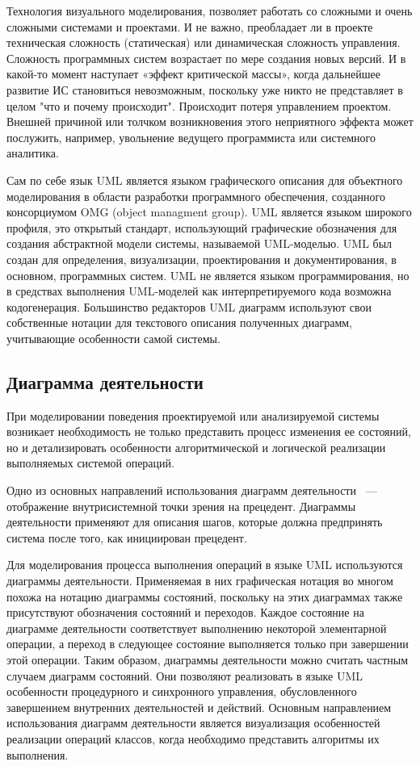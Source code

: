 Технология визуального моделирования, позволяет работать со сложными и очень сложными системами и проектами. И не важно, преобладает ли в проекте техническая сложность (статическая) или динамическая сложность управления. Сложность программных систем возрастает по мере создания новых версий. И в какой-то момент наступает «эффект критической массы», когда дальнейшее развитие ИС становиться невозможным, поскольку уже никто не представляет в целом "что и почему происходит". Происходит потеря управлением проектом. Внешней причиной или толчком возникновения этого неприятного эффекта может послужить, например, увольнение ведущего программиста или системного аналитика.

Сам по себе язык UML является языком графического описания для объектного моделирования в области разработки программного обеспечения, созданного консорциумом OMG (object managment group). UML является языком широкого профиля, это открытый стандарт, использующий графические обозначения для создания абстрактной модели системы, называемой UML-моделью. UML был создан для определения, визуализации, проектирования и документирования, в основном, программных систем. UML не является языком программирования, но в средствах выполнения UML-моделей как интерпретируемого кода возможна кодогенерация. Большинство редакторов UML диаграмм используют свои собственные нотации для текстового описания полученных диаграмм, учитывающие особенности самой системы.

\subsection{Диаграмма деятельности}

При моделировании поведения проектируемой или анализируемой системы возникает необходимость не только представить процесс изменения ее состояний, но и детализировать особенности алгоритмической и логической реализации выполняемых системой операций.

Одно из основных направлений использования диаграмм деятельности ~--- отображение внутрисистемной точки зрения на прецедент. Диаграммы деятельности применяют для описания шагов, которые должна предпринять система после того, как инициирован прецедент. 

Для моделирования процесса выполнения операций в языке UML используются диаграммы деятельности. Применяемая в них графическая нотация во многом похожа на нотацию диаграммы состояний, поскольку на этих диаграммах также присутствуют обозначения состояний и переходов. Каждое состояние на диаграмме деятельности соответствует выполнению некоторой элементарной операции, а переход в следующее состояние выполняется только при завершении этой операции. Таким образом, диаграммы деятельности можно считать частным случаем диаграмм состояний. Они позволяют реализовать в языке UML особенности процедурного и синхронного управления, обусловленного завершением внутренних деятельностей и действий. Основным направлением использования диаграмм деятельности является визуализация особенностей реализации операций классов, когда необходимо представить алгоритмы их выполнения.

